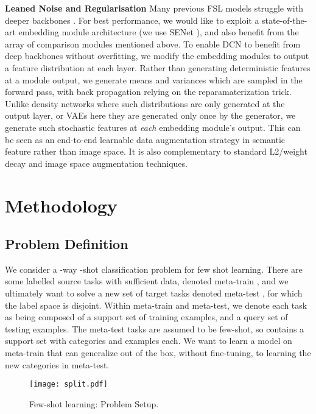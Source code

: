 \documentclass[conference]{IEEEtran}
\def\modelnameshort{DCN}
\newcommand{\keypoint}[1]{\vspace{0.05cm}\noindent\textbf{#1}\quad}
\begin{document}
\keypoint{Leaned Noise and Regularisation}
Many previous FSL models struggle with deeper backbones \cite{mishra2018simple, finn2017model}. For best performance, we would like to  exploit a state-of-the-art embedding module architecture (we use SENet \cite{hu2018senet}), and also benefit from the array of comparison modules mentioned above. To enable \modelnameshort{} to benefit from deep backbones without overfitting, we modify the embedding modules to output a feature distribution at each layer. Rather than generating deterministic features at a module output, we generate means and variances which are sampled in the forward pass, with back propagation relying on the reparamaterization trick. Unlike density networks \cite{bishop1994mdn} where such distributions are only generated at the output layer, or VAEs \cite{kingma2014variationalAutoEncoder} here they are generated only once by the generator, we generate  such stochastic features at \emph{each} embedding module's output. This can be seen as an end-to-end learnable data augmentation strategy in semantic feature rather than image space. It is also complementary to standard L2/weight decay and image space augmentation techniques.

\section{Methodology}
\subsection{Problem Definition} 
We consider a -way -shot classification problem for few shot learning. There are some labelled source tasks with sufficient data, denoted meta-train , and we ultimately want to solve a new set of target tasks denoted meta-test , for which the label space is disjoint.  Within meta-train and meta-test, we denote each task as being composed of a support set of training examples, and a query set of testing examples. The meta-test tasks are assumed to be few-shot, so  contains a support set with  categories and  examples each. We want to learn a model on meta-train that can generalize out of the box, without fine-tuning, to learning the new categories in meta-test.

\begin{figure}[h]
\centering
\texttt{[image: split.pdf]}
\caption{\small Few-shot learning: Problem Setup.}
\label{fig:meta}
\end{figure}
\end{document}
